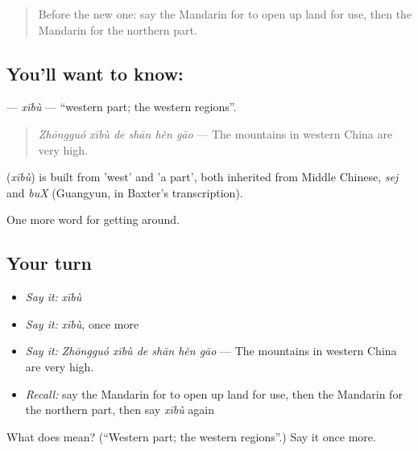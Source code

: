 \label{lesson:ZH-C438-xibu}



\begin{quote}
Before the new one: say the Mandarin for to open up land for use, then the Mandarin for the northern part.
\end{quote}

\subsection*{You'll want to know: }
\textbf{} — \emph{xībù} — \textquotedblleft{}western part; the western regions\textquotedblright{}.

\begin{quote}
\textbf{} \emph{Zhōngguó xībù de shān hěn gāo} — The mountains in western China are very high.
\end{quote}

\begin{cousinweb}
\textbf{} (\emph{xībù}) is built from  'west' and  'a part', both inherited from Middle Chinese, \emph{sej} and \emph{buX} (Guangyun, in Baxter's transcription).
\end{cousinweb}

\begin{grammarlens}[title={What you've built}]
One more word for getting around.
\end{grammarlens}

\subsection*{Your turn}
\begin{itemize}
\raggedright
  \item \emph{Say it:} \emph{xībù}
  \item \emph{Say it:} \emph{xībù}, once more
  \item \emph{Say it:} \emph{Zhōngguó xībù de shān hěn gāo} — The mountains in western China are very high.
  \item \emph{Recall:} say the Mandarin for to open up land for use, then the Mandarin for the northern part, then say \emph{xībù} again
\end{itemize}

\begin{tcolorbox}[breakable,colback=teal!4,colframe=teal!35!black,title={Before you move on}]
What does  mean? (\textquotedblleft{}Western part; the western regions\textquotedblright{}.) Say it once more.
\end{tcolorbox}

